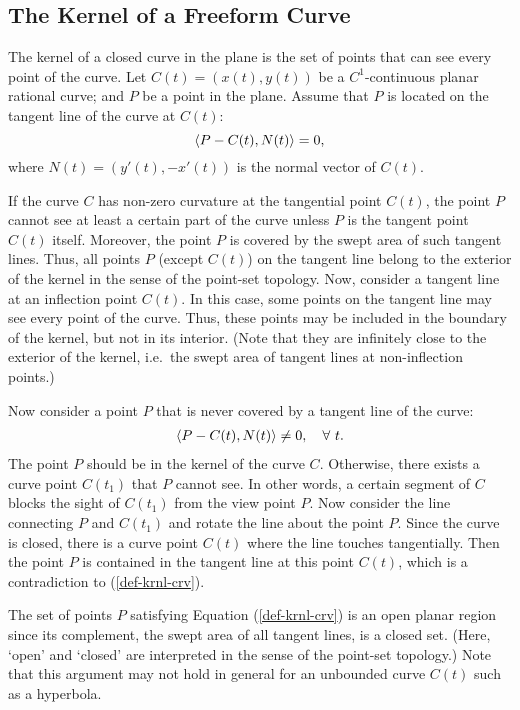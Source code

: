 \documentclass{elsart}
\begin{document}
\subsection{The Kernel of a Freeform Curve}
\label{subsec-kernel-curve}

The kernel of a closed curve in the plane is the set of points
that can see every point of the curve.
Let $C(t) = (x(t),y(t))$ be a $C^1$-continuous planar rational curve;
and $P$ be a point in the plane.
Assume that $P$ is located on the tangent line of the curve at $C(t)$:
\[
\left<{P-C(t)}, {N(t)} \right> = 0,
\]
where $N(t) = (y'(t),-x'(t))$ is the normal vector of $C(t)$.

If the curve $C$ has non-zero curvature at the tangential point $C(t)$,
the point $P$ cannot see at least a certain part of the curve
unless $P$ is the tangent point $C(t)$ itself.
%
%
Moreover, the point $P$ is covered by the swept area of such tangent lines.
Thus, all points $P$ (except $C(t)$) on the tangent line belong to
the exterior of the kernel in the sense of the point-set topology.
Now, consider a tangent line at an inflection point $C(t)$.
In this case, some points on the tangent line may see
every point of the curve.  Thus, these points may be included
in the boundary of the kernel, but not in its interior.
(Note that they are infinitely close to the exterior of the kernel,
i.e.~the swept area of tangent lines at non-inflection points.)

Now consider a point $P$ that is never covered by a tangent line
of the curve:
\begin{eqnarray}
\left<{P - C(t)}, {N(t)} \right> \neq 0,\quad \forall\ t.
\label{def-krnl-crv}
\end{eqnarray}
The point $P$ should be in the kernel of the curve $C$.
Otherwise, there exists a curve point $C(t_1)$ that $P$ cannot see.
In other words, a certain segment of $C$ blocks the sight of $C(t_1)$
from the view point $P$.  Now consider the line connecting $P$ and
$C(t_1)$ and rotate the line about the point $P$.  Since the curve
is closed, there is a curve point $C(t)$ where the line touches
tangentially.  Then the point $P$ is contained in the tangent line
at this point $C(t)$, which is a contradiction to (\ref{def-krnl-crv}).

The set of points $P$ satisfying Equation (\ref{def-krnl-crv}) is
an open planar region since its complement, the swept area of
all tangent lines, is a closed set.  (Here, `open' and `closed'
are interpreted in the sense of the point-set topology.)
Note that this argument may not hold in general
for an unbounded curve $C(t)$ such as a hyperbola.
\end{document}
